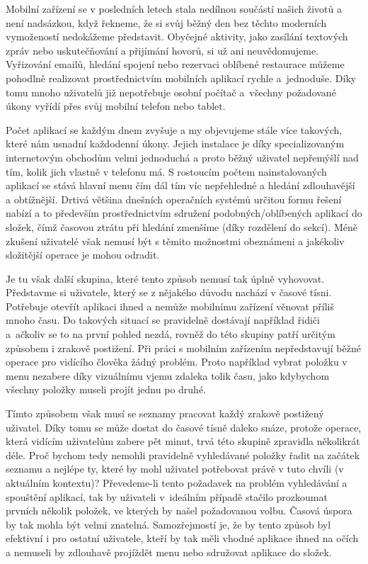 \documentclass[thesis=M,czech]{FITthesis}[2012/06/26]
\begin{document}
\begin{introduction}
Mobilní zařízení se v posledních letech stala nedílnou součástí našich životů a není nadsázkou, když řekneme, že si svůj běžný den bez těchto moderních vymožeností nedokážeme představit. Obyčejné aktivity, jako zasílání textových zpráv nebo uskutečňování a přijímání hovorů, si už ani neuvědomujeme. Vyřizování emailů, hledání spojení nebo rezervaci oblíbené restaurace můžeme pohodlně realizovat prostřednictvím mobilních aplikací rychle a~jednoduše. Díky tomu mnoho uživatelů již nepotřebuje osobní počítač a~všechny požadované úkony vyřídí přes svůj mobilní telefon nebo tablet.

Počet aplikací se každým dnem zvyšuje a my objevujeme stále více takových, které nám usnadní každodenní úkony. Jejich instalace je díky specializovaným internetovým obchodům velmi jednoduchá a proto běžný uživatel nepřemýšlí nad tím, kolik jich vlastně v telefonu má. S rostoucím počtem nainstalovaných aplikací se stává hlavní menu čím dál tím víc nepřehledné a hledání zdlouhavější a obtížnější. Drtivá většina dnešních operačních systémů určitou formu řešení nabízí a to především prostřednictvím sdružení podobných/oblíbených aplikací do složek, čímž časovou ztrátu při hledání zmenšíme (díky rozdělení do sekcí). Méně zkušení uživatelé však nemusí být s těmito možnostmi obeznámeni a jakékoliv složitější operace je mohou odradit.

Je tu však další skupina, které tento způsob nemusí tak úplně vyhovovat. Představme si uživatele, který se z nějakého důvodu nachází v časové tísni. Potřebuje otevřít aplikaci ihned a nemůže mobilnímu zařízení věnovat příliš mnoho času. Do takových situací se pravidelně dostávají například řidiči a~ačkoliv se to na první pohled nezdá, rovněž do této skupiny patří určitým způsobem i zrakově postižení. Při práci s mobilním zařízením nepředstavují běžné operace pro vidícího člověka žádný problém. Proto například vybrat položku v menu nezabere díky vizuálnímu vjemu zdaleka tolik času, jako kdybychom všechny položky museli projít jednu po druhé.

Tímto způsobem však musí se seznamy pracovat každý zrakově postižený uživatel. Díky tomu se může dostat do časové tísně daleko snáze, protože operace, která vidícím uživatelům zabere pět minut, trvá této skupině zpravidla několikrát déle. Proč bychom tedy nemohli pravidelně vyhledávané položky řadit na začátek seznamu a nejlépe ty, které by mohl uživatel potřebovat právě v tuto chvíli (v aktuálním kontextu)? Převedeme-li tento požadavek na problém vyhledávání a spouštění aplikací, tak by uživateli v~ideálním případě stačilo prozkoumat prvních několik položek, ve kterých by našel požadovanou volbu. Časová úspora by tak mohla být velmi znatelná. Samozřejmostí je, že by tento způsob byl efektivní i pro ostatní uživatele, kteří by tak měli vhodné aplikace ihned na očích a nemuseli by zdlouhavě projíždět menu nebo sdružovat aplikace do složek.


\end{introduction}
\end{document}
